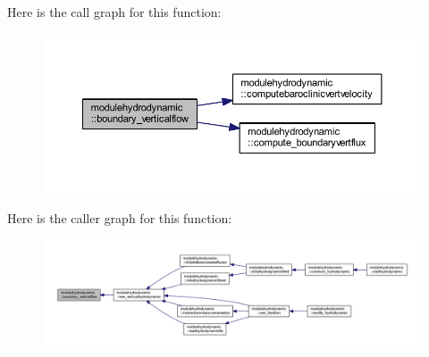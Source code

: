 Here is the call graph for this function\+:\nopagebreak
\begin{figure}[H]
\begin{center}
\leavevmode
\includegraphics[width=350pt]{namespacemodulehydrodynamic_a08186b721c96e023d8a58a34dc22522f_cgraph}
\end{center}
\end{figure}
Here is the caller graph for this function\+:\nopagebreak
\begin{figure}[H]
\begin{center}
\leavevmode
\includegraphics[width=350pt]{namespacemodulehydrodynamic_a08186b721c96e023d8a58a34dc22522f_icgraph}
\end{center}
\end{figure}
\mbox{\label{namespacemodulehydrodynamic_a1e87e450d8be8b7bee682d2ef22558f8}} 

